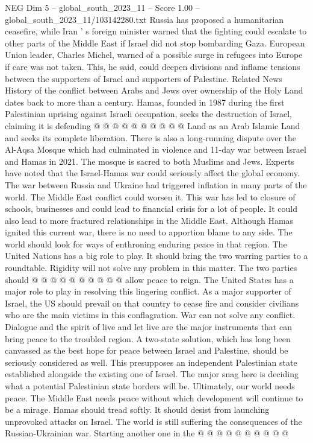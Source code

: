 \begin{textsample}{NEG Dim 5 – global\_south\_2023\_11 – Score 1.00 – global\_south\_2023\_11/103142280.txt}
Russia has proposed a humanitarian ceasefire, while Iran ' s foreign minister warned that the fighting could escalate to other parts of the Middle East if Israel did not stop bombarding Gaza.
European Union leader, Charles Michel, warned of a possible surge in refugees into Europe if care was not taken.
This, he said, could deepen divisions and inflame tensions between the supporters of Israel and supporters of Palestine.
Related News History of the conflict between Arabs and Jews over ownership of the Holy Land dates back to more than a century.
Hamas, founded in 1987 during the first Palestinian uprising against Israeli occupation, seeks the destruction of Israel, claiming it is defending @ @ @ @ @ @ @ @ @ @ Land as an Arab Islamic Land and seeks its complete liberation.
There is also a long-running dispute over the Al-Aqsa Mosque which had culminated in violence and 11-day war between Israel and Hamas in 2021.
The mosque is sacred to both Muslims and Jews.
Experts have noted that the Israel-Hamas war could seriously affect the global economy.
The war between Russia and Ukraine had triggered inflation in many parts of the world.
The Middle East conflict could worsen it.
This war has led to closure of schools, businesses and could lead to financial crisis for a lot of people.
It could also lead to more fractured relationships in the Middle East.
Although Hamas ignited this current war, there is no need to apportion blame to any side.
The world should look for ways of enthroning enduring peace in that region.
The United Nations has a big role to play.
It should bring the two warring parties to a roundtable.
Rigidity will not solve any problem in this matter.
The two parties should @ @ @ @ @ @ @ @ @ @ allow peace to reign.
The United States has a major role to play in resolving this lingering conflict.
As a major supporter of Israel, the US should prevail on that country to cease fire and consider civilians who are the main victims in this conflagration.
War can not solve any conflict.
Dialogue and the spirit of live and let live are the major instruments that can bring peace to the troubled region.
A two-state solution, which has long been canvassed as the best hope for peace between Israel and Palestine, should be seriously considered as well.
This presupposes an independent Palestinian state established alongside the existing one of Israel.
The major snag here is deciding what a potential Palestinian state borders will be.
Ultimately, our world needs peace.
The Middle East needs peace without which development will continue to be a mirage.
Hamas should tread softly.
It should desist from launching unprovoked attacks on Israel.
The world is still suffering the consequences of the Russian-Ukrainian war.
Starting another one in the @ @ @ @ @ @ @ @ @ @

\end{textsample}
